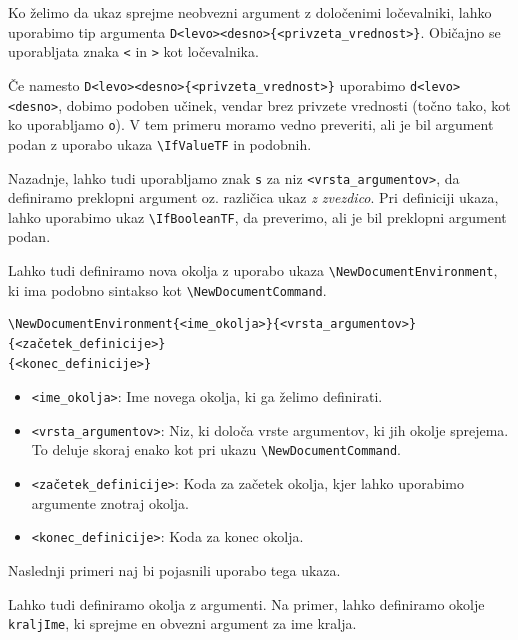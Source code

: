 Ko želimo da ukaz sprejme neobvezni argument z določenimi ločevalniki, lahko uporabimo tip argumenta \texttt{D\textless levo\textgreater \textless desno\textgreater \{\textless privzeta\_vrednost\textgreater \}}.
Običajno se uporabljata znaka \texttt{\textless } in \texttt{\textgreater } kot ločevalnika.

Če namesto \texttt{D\textless levo\textgreater \textless desno\textgreater \{\textless privzeta\_vrednost\textgreater \}} uporabimo \texttt{d\textless levo\textgreater \textless desno\textgreater }, dobimo podoben učinek, vendar brez privzete vrednosti (točno tako, kot ko uporabljamo \texttt{o}). V tem primeru moramo vedno preveriti, ali je bil argument podan z uporabo ukaza \texttt{{\textbackslash}IfValueTF} in podobnih.

Nazadnje, lahko tudi uporabljamo znak \texttt{s} za niz \texttt{\textless vrsta\_argumentov\textgreater }, da definiramo preklopni argument oz. različica ukaz \textit{z zvezdico}. Pri definiciji ukaza, lahko uporabimo ukaz \texttt{{\textbackslash}IfBooleanTF}, da preverimo, ali je bil preklopni argument podan.

Lahko tudi definiramo nova okolja z uporabo ukaza \texttt{{\textbackslash}NewDocumentEnvironment}, ki ima podobno sintakso kot \texttt{{\textbackslash}NewDocumentCommand}.

\begin{verbatim}
\NewDocumentEnvironment{<ime_okolja>}{<vrsta_argumentov>}
{<začetek_definicije>}
{<konec_definicije>}
\end{verbatim}

\begin{itemize}
\item \texttt{\textless ime\_okolja\textgreater }: Ime novega okolja, ki ga želimo definirati.
\item \texttt{\textless vrsta\_argumentov\textgreater }: Niz, ki določa vrste argumentov, ki jih okolje sprejema. To deluje skoraj enako kot pri ukazu \texttt{{\textbackslash}NewDocumentCommand}.
\item \texttt{\textless začetek\_definicije\textgreater }: Koda za začetek okolja, kjer lahko uporabimo argumente znotraj okolja.
\item \texttt{\textless konec\_definicije\textgreater }: Koda za konec okolja.
\end{itemize}

Naslednji primeri naj bi pojasnili uporabo tega ukaza.

\begin{example}\label{eg_okolja_kralj-1}\end{example}Lahko tudi definiramo okolja z argumenti. Na primer, lahko definiramo okolje \texttt{kraljIme}, ki sprejme en obvezni argument za ime kralja.


